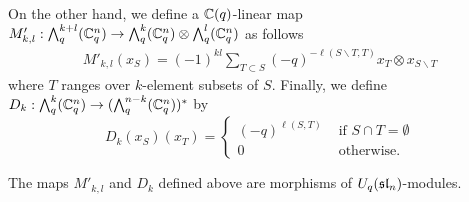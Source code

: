\documentclass[11pt]{amsart}
\begin{document}
On the other hand, we define a $ \bC(q)$-linear map $M'_{k,l} :\Alt{k+l}{q}(\bC^n_q) \rightarrow \Alt{k}{q} (\bC^n_q) \otimes \Alt{l}{q}(\bC^n_q) $ as follows
\begin{align*}
M'_{k,l}(x_S) = (-1)^{kl} \sum_{T \subset S} (-q)^{-\ell(S \smallsetminus T, T)} x_T \otimes x_{S \smallsetminus T}
\end{align*}
where $ T $ ranges over $k$-element subsets of $ S $. Finally, we define $D_k : \Alt{k}{q}( \bC^n_q) \rightarrow (\Alt{n-k}{q}  (\bC^n_q))^*$ by
$$
 D_k(x_S)(x_T) = \begin{cases} (-q)^{\ell(S, T)} & \text{ if } S \cap T = \emptyset \\
 0 & \text{ otherwise. }
 \end{cases}
$$

\begin{lem}\label{lem:slnmaps}
The maps $M'_{k,l}$ and $D_k$ defined above are morphisms of $U_q(\sl_n)$-modules.
\end{lem}
\end{document}
